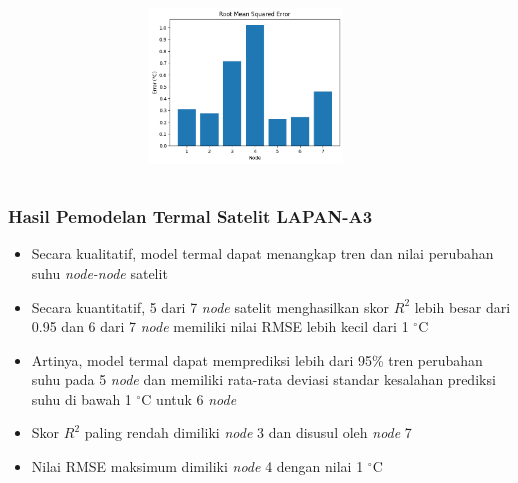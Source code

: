 \documentclass[8pt]{beamer}
\begin{document}
\begin{frame}
\begin{columns}[T]
\begin{figure}
      \end{figure}
      \begin{figure}
          \includegraphics[width=0.6\textwidth]{figure/rmse_2018-05-20.png}
      \end{figure}
  \end{columns}
\end{frame}
\begin{frame}
  \frametitle{Hasil Pemodelan Termal Satelit LAPAN-A3}
  \begin{itemize}
    \item Secara kualitatif, model termal dapat menangkap tren dan nilai perubahan suhu \textit{node-node} satelit
    \item Secara kuantitatif, 5 dari 7 \textit{node} satelit menghasilkan skor $R^2$ lebih besar dari 0.95 dan 6 dari 7 \textit{node} memiliki nilai RMSE lebih kecil dari 1 $^\circ$C
    \item Artinya, model termal dapat memprediksi lebih dari 95\% tren perubahan suhu pada 5 \textit{node} dan memiliki rata-rata deviasi standar kesalahan prediksi suhu di bawah 1 $^\circ$C untuk 6 \textit{node}
    \item Skor $R^2$ paling rendah dimiliki \textit{node} 3 dan disusul oleh \textit{node} 7
    \item Nilai RMSE maksimum dimiliki \textit{node} 4 dengan nilai 1 $^\circ$C
  \end{itemize}
\end{frame}
\end{document}
